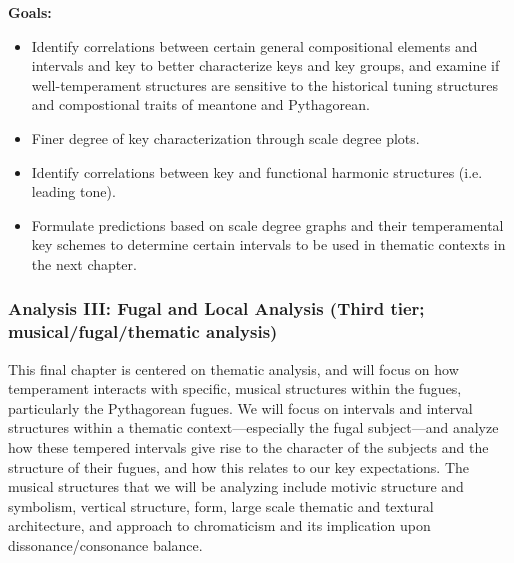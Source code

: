 \textbf{Goals:}

\begin{itemize}
\tightlist
\item
  Identify correlations between certain general compositional elements
  and intervals and key to better characterize keys and key groups, and
  examine if well-temperament structures are sensitive to the historical
  tuning structures and compostional traits of meantone and Pythagorean.
\item
  Finer degree of key characterization through scale degree plots.
\item
  Identify correlations between key and functional harmonic structures
  (i.e. leading tone).
\item
  Formulate predictions based on scale degree graphs and their
  temperamental key schemes to determine certain intervals to be used in
  thematic contexts in the next chapter.
\end{itemize}

\subsubsection{Analysis III: Fugal and Local Analysis (Third tier;
musical/fugal/thematic
analysis)}\label{analysis-iii-fugal-and-local-analysis-third-tier-musicalfugalthematic-analysis}

This final chapter is centered on thematic analysis, and will focus on
how temperament interacts with specific, musical structures within the
fugues, particularly the Pythagorean fugues. We will focus on intervals
and interval structures within a thematic context---especially the
fugal subject---and analyze how these tempered intervals give rise
to the character of the subjects and the structure of their fugues, and
how this relates to our key expectations. The musical structures that we
will be analyzing include motivic structure and symbolism, vertical
structure, form, large scale thematic and textural architecture, and
approach to chromaticism and its implication upon dissonance/consonance
balance.

